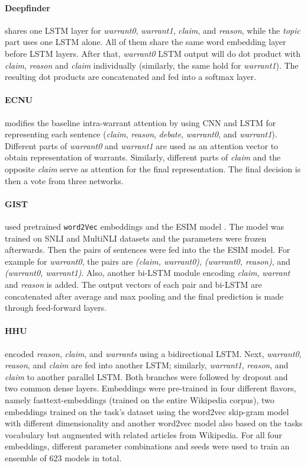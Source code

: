 \paragraph{Deepfinder}
shares one LSTM layer for \emph{warrant0}, \emph{warrant1}, \emph{claim}, and \emph{reason}, while the \emph{topic} part uses one LSTM alone. All of them share the same word embedding layer before LSTM layers. After that, \emph{warrant0} LSTM output will do dot product with \emph{claim}, \emph{reason} and \emph{claim} individually (similarly, the same hold for \emph{warrant1}). The resulting dot products are concatenated and fed into a softmax layer.


\paragraph{ECNU}
modifies the baseline intra-warrant attention \cite{Habernal.et.al.2018.NAACL.arct} by using CNN and LSTM for representing each sentence (\emph{claim}, \emph{reason}, \emph{debate}, \emph{warrant0}, and \emph{warrant1}). Different parts of \emph{warrant0} and \emph{warrant1} are used as an attention vector to obtain representation of warrants. Similarly, different parts of \emph{claim} and the opposite \emph{claim} serve as attention for the final representation. The final decision is then a vote from three networks.


\paragraph{GIST} used pretrained \texttt{word2Vec} embeddings and the ESIM model \cite{Chen.et.al.2017.ACL.ESIM}. The model was trained on SNLI \cite{Bowman.et.al.2015} and MultiNLI \cite{nangia-EtAl:2017:RepEval} datasets and the parameters were frozen afterwards. Then the pairs of sentences were fed into the the ESIM model. For example for \emph{warrant0}, the pairs are \emph{(claim, warrant0)}, \emph{(warrant0, reason)}, and \emph{(warrant0, warrant1)}. Also, another bi-LSTM module encoding \emph{claim}, \emph{warrant} and \emph{reason} is added. The output vectors of each pair and bi-LSTM are concatenated after average and max pooling and the final prediction is made through feed-forward layers.


\paragraph{HHU}
encoded \emph{reason}, \emph{claim}, and \emph{warrants} using a bidirectional LSTM. Next, \emph{warrant0}, \emph{reason}, and \emph{claim} are fed into another LSTM; similarly, \emph{warrant1}, \emph{reason}, and \emph{claim} to another parallel LSTM. Both branches were followed by dropout and two common dense layers. Embeddings were pre-trained in four different flavors, namely fasttext-embeddings (trained on the entire Wikipedia corpus), two embeddings trained on the task's dataset using the word2vec skip-gram model with different dimensionality and another word2vec model also based on the tasks vocabulary but augmented with related articles from Wikipedia. For all four embeddings, different parameter combinations and seeds were used to train an ensemble of 623 models in total.

